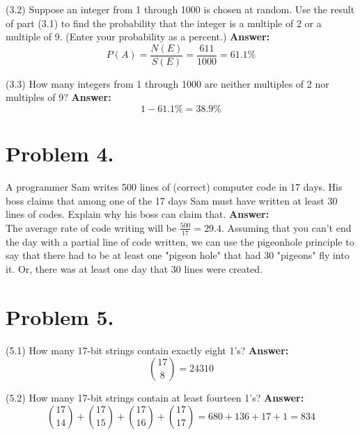 \documentclass[11pt]{article}
\begin{document}
\noindent
(3.2) Suppose an integer from 1 through 1000 is chosen at random. Use the result of part (3.1) to find the probability that the integer is a multiple of 2 or a multiple of 9. (Enter your probability as a percent.)
\newline
\newline
\noindent
{\bf Answer:}
\newline
\[P(A) = \frac{N(E)}{S(E)} = \frac{611}{1000} = 61.1\%\]
\newline

\noindent
(3.3) How many integers from 1 through 1000 are neither multiples of 2 nor multiples of 9?
\newline
\newline
\noindent
{\bf Answer:}\\
\[1-61.1\% = 38.9\%\]
\newpage

\section*{Problem 4.}

A programmer Sam writes 500 lines of (correct) computer code in 17 days. His
boss claims that among one of the 17 days Sam must have written at least 30
lines of codes. Explain why his boss can claim that.
\newline
\newline
\noindent
{\bf Answer:}\\
The average rate of code writing will be $\frac{500}{17} = 29.4$. Assuming that you can't end the day with a partial line of code written, we can use the pigeonhole principle to say that there had to be at least one "pigeon hole" that had 30 "pigeons" fly into it. Or, there was at least one day that 30 lines were created.
\newline
\newpage

\section*{Problem 5.}

\noindent
(5.1) How many {\color{red}17}-bit strings contain exactly eight {\color{red}1}'s?
\newline
\newline
\noindent
{\bf Answer:}\\
\[{17 \choose 8} = 24310\]
\newline
\newline

\noindent
(5.2) How many {\color{red}17}-bit strings contain at least fourteen {\color{red}1}'s?
\newline
\newline
\noindent
{\bf Answer:}\\
\[{17 \choose 14} + {17 \choose 15} + {17 \choose 16} +{17 \choose 17} = 680 + 136 + 17 + 1 = 834\]
\newline
\newline
\end{document}
